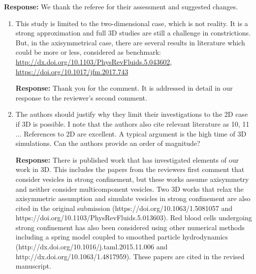\documentclass[11pt]{article}
\begin{document}
\noindent
{\bf Response:} We thank the referee for their assessment and suggested
changes.

\begin{enumerate}
\item This study is limited to the two-dimensional case, which is not
  reality. It is a strong approximation and full 3D studies are still a
    challenge in constrictions. But, in the axisymmetrical case, there
    are several results in literature which could be more or less,
    considered as benchmark:
    \url{http://dx.doi.org/10.1103/PhysRevFluids.5.043602}, \\
    \url{https://doi.org/10.1017/jfm.2017.743}

\noindent
{\bf Response:} Thank you for the comment. It is addressed in detail in
our response to the reviewer's second comment.

\item The authors should justify why they limit their investigations to
  the 2D case if 3D is possible. I note that the authors also cite
    relevant literature as 10, 11 $\ldots$ References to 2D are
    excellent. A typical argument is the high time of 3D simulations.
    Can the authors provide an order of magnitude?

\noindent
{\bf Response:} There is published work that has investigated elements
of our work in  3D. This includes the papers from the reviewers first
comment that consider vesicles in strong confinement, but these works
assume axisymmetry and neither consider multicomponent vesicles. Two
3D works that relax the axisymmetric assumption and simulate vesicles in
strong confinement are also cited in the original submission
(https://doi.org/10.1063/1.5081057 and
https://doi.org/10.1103/PhysRevFluids.5.013603). Red blood cells
undergoing strong confinement has also been considered using other
numerical methods including a spring model coupled to smoothed particle
hydrodynamics (http://dx.doi.org/10.1016/j.taml.2015.11.006 and
http://dx.doi.org/10.1063/1.4817959). These papers are cited in the
revised manuscript.


\end{enumerate}
\end{document}
